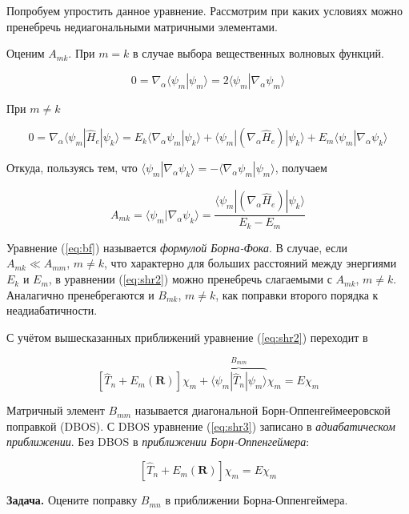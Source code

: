 \documentclass[12pt, oneside]{article}
\numberwithin{equation}{section}  %
\begin{document}
Попробуем упростить данное уравнение. Рассмотрим при каких условиях можно пренебречь недиагональными матричными элементами.

Оценим \(A_{mk}\). При \(m = k\) в случае выбора вещественных волновых функций.

\[0 = \nabla_\alpha \langle \psi_m | \psi_m \rangle = 2 \langle \psi_m | \nabla_\alpha \psi_m \rangle\]

При \(m \neq k\)

\[0 = \nabla_\alpha \langle \psi_m | \hat{H}_e| \psi_k \rangle = E_k \langle \nabla_\alpha \psi_m | \psi_k \rangle + \langle \psi_m | (\nabla_\alpha \hat{H}_e) | \psi_k \rangle + E_m \langle \psi_m | \nabla_\alpha \psi_k \rangle \]

Откуда, пользуясь тем, что \(\langle \psi_m | \nabla_\alpha \psi_k \rangle = - \langle \nabla_\alpha \psi_m | \psi_m \rangle\), получаем

\begin{equation}
    A_{mk} = \langle \psi_m | \nabla_\alpha \psi_k \rangle = \dfrac{\langle \psi_m | (\nabla_\alpha \hat{H}_e )| \psi_k \rangle}{E_k - E_m}
    \label{eq:bf}
\end{equation}

Уравнение (\ref{eq:bf}) называется \textit{формулой Борна-Фока}. В случае, если \(A_{mk} \ll A_{mm}\), \(m \neq k\), что характерно для больших расстояний между энергиями \(E_k\) и \(E_m\), в уравнении (\ref{eq:shr2}) можно пренебречь слагаемыми с \(A_{mk}\), \(m \neq k\). Аналагично пренебрегаются и \(B_{mk}\), \(m \neq k\), как поправки второго порядка к неадиабатичности.

С учётом вышесказанных приближений уравнение (\ref{eq:shr2}) переходит в

\begin{equation}
    \left[ \hat{T}_n + E_m (\bm{R}) \right] \chi_m + \overbrace{\langle \psi_m | \hat{T}_n | \psi_m \rangle}^{B_{mm}} \chi_m = E \chi_m
    \label{eq:shr3}
\end{equation}

Матричный элемент \(B_{mm}\) называется диагональной Борн-Оппенгеймееровской поправкой (DBOS).
С DBOS уравнение (\ref{eq:shr3}) записано в \textit{адиабатическом приближении}. Без DBOS в \textit{приближении Борн-Оппенгеймера}:

\begin{equation}
    \left[ \hat{T}_n + E_m (\bm{R}) \right] \chi_m = E \chi_m
\end{equation}

\textbf{Задача.} Оцените поправку \(B_{mn}\) в приближении Борна-Оппенгеймера.
\end{document}
